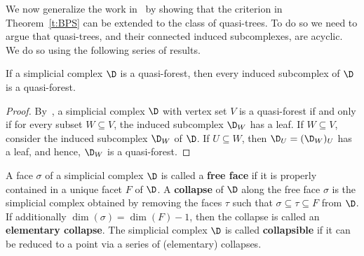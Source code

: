 We now generalize the work in~\cite{F14} by showing that the criterion
in Theorem~\ref{t:BPS} can be extended to the class of quasi-trees. To do so
we need to argue that quasi-trees, and their connected induced
subcomplexes, are acyclic. We do so using the following series of
results.

\begin{prop}\label{p:qtree-induced} If a simplicial complex  $\D$ is a 
quasi-forest, then every induced subcomplex of $\D$ is a quasi-forest.
\end{prop}

\begin{proof} By~\cite[Proposition 6]{FH},
a simplicial complex $\D$ with vertex set $V$ is a quasi-forest if
and only if for every subset $W \subseteq V$, the induced subcomplex
$\D_W$ has a leaf.  If $W \subseteq V$, consider the induced
subcomplex $\D_W$ of $\D$. If $U \subseteq W$, then $\D_U=(\D_W)_U$
has a leaf, and hence, $\D_W$ is a quasi-forest.
\end{proof}

A face $\sigma$ of a simplicial complex $\D$ is called a {\bf free
face} if it is properly contained in a unique facet $F$ of
$\D$. A {\bf collapse} of $\D$ along the free face $\sigma$ is the simplicial complex obtained by removing the faces $\tau$ such that $\sigma\subseteq \tau
\subseteq F$ from $\D$.  If additionally $\dim(\sigma)=\dim(F)-1$,
then the collapse is called an {\bf elementary collapse}. The
simplicial complex $\D$ is called {\bf collapsible} if it can be
reduced to a point via a series of \textup{(}elementary\textup{)} collapses.



